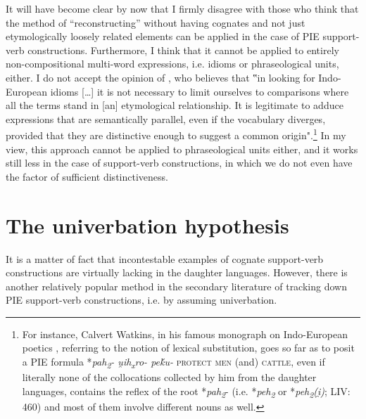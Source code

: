 \documentclass[output=paper,colorlinks,citecolor=brown]{langscibook}
\begin{document}
It will have become clear by now that I firmly disagree with those who think that the method of “reconstructing” without having cognates and not just etymologically loosely related elements can be applied in the case of PIE support-verb constructions. Furthermore, I think that it cannot be applied to entirely non-compositional multi-word expressions, i.e. idioms or phraseological units, either. I do not accept the opinion of \citet[79]{West2007}, who believes that ‟in looking for Indo-European idioms […] it is not necessary to limit ourselves to comparisons where all the terms stand in [an] etymological relationship. It is legitimate to adduce expressions that are semantically parallel, even if the vocabulary diverges, provided that they are distinctive enough to suggest a common origin".\footnote{For instance, Calvert Watkins, in his famous monograph on Indo-European poetics \citep[210--213]{Watkins1995}, referring to the notion of lexical substitution, goes so far as to posit a PIE formula *\textit{pah\textsubscript{2}- u̯ih\textsubscript{x}ro- peḱu-} \textsc{protect men} (and) \textsc{cattle}, even if literally none of the collocations collected by him from the daughter languages, contains the reflex of the root *\textit{pah\textsubscript{2}}- (i.e. *\textit{peh\textsubscript{2}} or *\textit{peh\textsubscript{2}(i̯)}; LIV: 460) and most of them involve different nouns as well.}          In my view, this approach cannot be applied to phraseological units either, and it works still less in the case of support-verb constructions, in which we do not even have the factor of sufficient distinctiveness.

\section{The univerbation hypothesis}

It is a matter of fact that incontestable examples of cognate support-verb constructions are virtually lacking in the daughter languages. However, there is another relatively popular method in the secondary literature of tracking down PIE support-verb constructions, i.e. by assuming univerbation.
\end{document}
